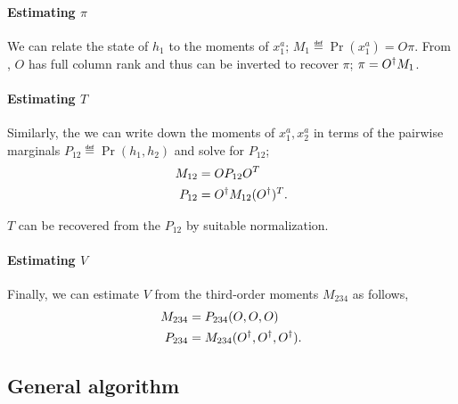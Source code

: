 
\paragraph{Estimating $\pi$}

We can relate the state of $h_1$ to the moments of $x^a_1$; $M_1
  \eqdef \Pr(x^a_1) = O \pi$. From , $O$ has full
  column rank and thus can be inverted to recover $\pi$; $\pi = {O}^{\dagger}
  M_1$.

\paragraph{Estimating $T$}

Similarly, the we can write down the moments of $x^a_1, x^a_2$ in terms
of the pairwise marginals $P_{12} \eqdef \Pr(h_1, h_2)$ and solve for
$P_{12}$;
\begin{align*}
  M_{12} &= O P_{12} O^T \\
  P_{12} &= {O}^{\dagger} M_{12} ({O}^{\dagger})^T.
\end{align*}

$T$ can be recovered from the $P_{12}$ by suitable normalization.

\paragraph{Estimating $V$}

Finally, we can estimate $V$ from the third-order moments $M_{234}$ as
follows,
\begin{align*}
  M_{234} &= P_{234}(O, O, O) \\
  P_{234} &= M_{234}({O}^{\dagger}, {O}^{\dagger}, {O}^{\dagger}).
\end{align*}

\subsection{General algorithm}

